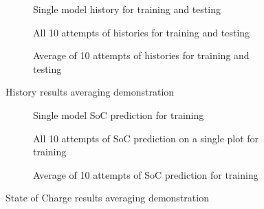 \begin{figure*}[htbp]
  \centering
  \begin{subfigure}[b]{0.325\textwidth}
      \centering
      
      \caption{Single model history for training and testing}
      \label{subfig:Model-DEMO-1}
  \end{subfigure}
  \hfill
  \begin{subfigure}[b]{0.325\textwidth}
      \centering
      
      \caption{All 10 attempts of histories for training and testing}
      \label{subfig:Model-DEMO-10}
  \end{subfigure}
  \hfill
  \begin{subfigure}[b]{0.325\textwidth}
      \centering
      
      \caption{Average of 10 attempts of histories for training and testing}
      \label{subfig:Model-DEMO-avr}
  \end{subfigure}
  \caption{History results averaging demonstration}
  \label{fig:Model-DEMO}
\end{figure*}
\begin{figure*}[htbp]
  \centering
  \begin{subfigure}[b]{0.325\textwidth}
      \centering
      
      \caption{Single model SoC prediction for training \ \ \ \ \ }
      \label{subfig:Model-DEMO2-1}
  \end{subfigure}
  \hfill
  \begin{subfigure}[b]{0.325\textwidth}
      \centering
      
      \caption{All 10 attempts of SoC prediction on a single plot for training}
      \label{subfig:Model-DEMO2-10}
  \end{subfigure}
  \hfill
  \begin{subfigure}[b]{0.325\textwidth}
      \centering
      
      \caption{Average of 10 attempts of SoC prediction for training}
      \label{subfig:Model-DEMO2-avr}
  \end{subfigure}
  \caption{State of Charge results averaging demonstration}
  \label{fig:Model-DEMO2}
\end{figure*}

